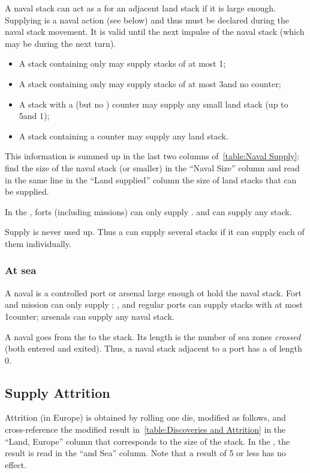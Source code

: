 A naval stack can act as a \SoS for an adjacent land stack if it is large
enough. Supplying is a naval action (see below) and thus must be declared
during the naval stack movement. It is valid until the next impulse of the
naval stack (which may be during the next turn).
\begin{itemize}
\item A stack containing only \NDE may supply stacks of at most 1\LD;
\item A stack containing only \ND may supply stacks of at most 3\LD and no
  \ARMY counter;
\item A stack with a \FLEET\facemoins (but no \FLEET\faceplus) counter may
  supply any small land stack (up to 5\LD and 1\Pasha);
\item A stack containing a \FLEET\faceplus counter may supply any land stack.
\end{itemize}
This information is summed up in the last two columns of~\ref{table:Naval
  Supply}: find the size of the naval stack (or smaller) in the ``Naval Size''
column and read in the same line in the ``Land supplied'' column the size of
land stacks that can be supplied.


In the \ROTW, forts (including missions) can only supply \LD. \TP and \COL can
supply any stack.

Supply is never used up. Thus a \SoS can supply several stacks if it can
supply each of them individually.

\subsubsection{At sea}
A naval \SoS is a controlled port or arsenal large enough ot hold the naval
stack. Fort and mission can only supply \ND; \TP, \COL and regular ports can
supply stacks with at most 1\FLEET counter; arsenals can supply any naval
stack.

A naval \LoS goes from the \SoS to the stack. Its length is the number of sea
zones \emph{crossed} (both entered and exited). Thus, a naval stack adjacent
to a port has a \LoS of length 0.

\subsection{Supply Attrition}
Attrition (in Europe) is obtained by rolling one die, modified as follows, and
cross-reference the modified result in~\ref{table:Discoveries and
  Attrition} in the ``Land, Europe'' column that corresponds to the size of
the stack. In the \ROTW, the result is read in the ``\ROTW and Sea''
column. Note that a result of 5 or less has no effect.

